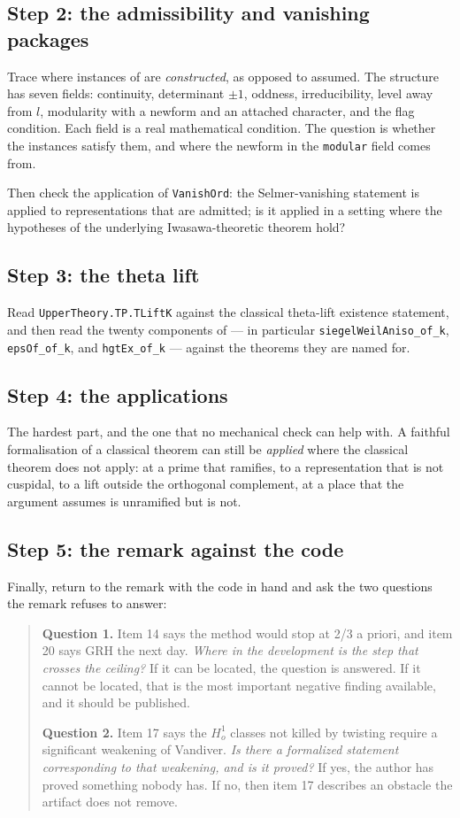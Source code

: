 \subsection{Step 2: the admissibility and vanishing packages}Trace where instances of  are
\emph{constructed}, as opposed to assumed. The structure has seven fields:
continuity, determinant $\pm 1$, oddness, irreducibility, level away from $l$,
modularity with a newform and an attached character, and the flag condition.
Each field is a real mathematical condition. The question is whether the
instances satisfy them, and where the newform in the \texttt{modular} field
comes from.

Then check the application of \texttt{VanishOrd}: the Selmer-vanishing
statement is applied to representations that are admitted; is it applied in a
setting where the hypotheses of the underlying Iwasawa-theoretic theorem
hold?

\subsection{Step 3: the theta lift}Read \texttt{UpperTheory.TP.TLiftK} against the classical theta-lift
existence statement, and then read the twenty components of
 --- in particular
\texttt{siegelWeilAniso\_of\_k}, \texttt{epsOf\_of\_k}, and
\texttt{hgtEx\_of\_k} --- against the theorems they are named for.

\subsection{Step 4: the applications}The hardest part, and the one that no mechanical check can help with. A
faithful formalisation of a classical theorem can still be \emph{applied}
where the classical theorem does not apply: at a prime that ramifies, to a
representation that is not cuspidal, to a lift outside the orthogonal
complement, at a place that the argument assumes is unramified but is not.

\subsection{Step 5: the remark against the code}Finally, return to the remark with the code in hand and ask the two questions
the remark refuses to answer:

\begin{quote}
\textbf{Question 1.} Item 14 says the method would stop at 2/3 a priori, and
item 20 says GRH the next day. \emph{Where in the development is the step
that crosses the ceiling?} If it can be located, the question is answered. If
it cannot be located, that is the most important negative finding available,
and it should be published.

\textbf{Question 2.} Item 17 says the $H^1_o$ classes not killed by twisting
require a significant weakening of Vandiver. \emph{Is there a formalized
statement corresponding to that weakening, and is it proved?} If yes, the
author has proved something nobody has. If no, then item 17 describes an
obstacle the artifact does not remove.
\end{quote}

